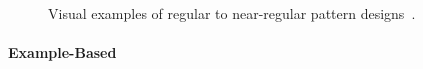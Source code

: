 \begin{figure}[t]
    \centering
    \caption{\label{fig:textures}Visual examples of regular to near-regular pattern designs~\cite{gieseke_2014_ipr}.}
\end{figure}

\paragraph*{Example-Based}
\label{para:analysis_regular_example}

